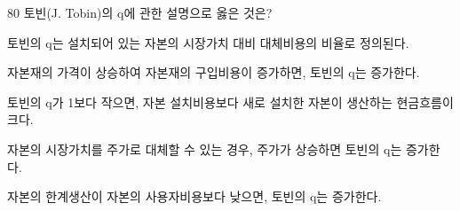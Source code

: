\begin{question}{80}
토빈(J. Tobin)의 q에 관한 설명으로 옳은 것은?
\begin{choices}
  \item 토빈의 q는 설치되어 있는 자본의 시장가치 대비 대체비용의 비율로 정의된다.
  \item 자본재의 가격이 상승하여 자본재의 구입비용이 증가하면, 토빈의 q는 증가한다.
  \item 토빈의 q가 1보다 작으면, 자본 설치비용보다 새로 설치한 자본이 생산하는 현금흐름이 크다.
  \item 자본의 시장가치를 주가로 대체할 수 있는 경우, 주가가 상승하면 토빈의 q는 증가한다.
  \item 자본의 한계생산이 자본의 사용자비용보다 낮으면, 토빈의 q는 증가한다.
\end{choices}
\end{question}
